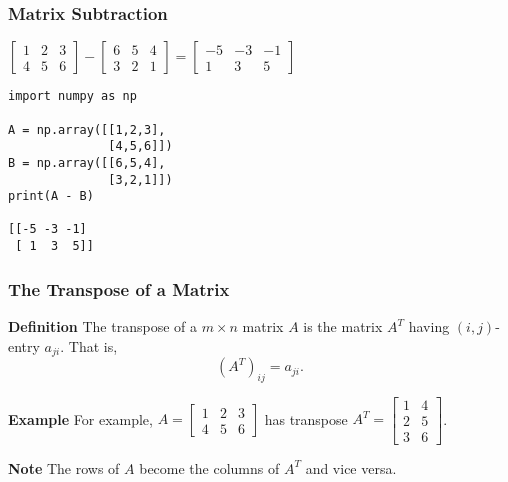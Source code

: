   \begin{frame}[fragile]\frametitle{Matrix Subtraction}
 
 $\begin{bmatrix}1 & 2 & 3 \\4 & 5 & 6\end{bmatrix}- \begin{bmatrix}6 & 5 & 4 \\3 & 2 & 1\end{bmatrix} = \begin{bmatrix}-5 & -3 & -1 \\1 & 3 & 5\end{bmatrix}$
\begin{lstlisting}
import numpy as np

A = np.array([[1,2,3],
              [4,5,6]])
B = np.array([[6,5,4],
              [3,2,1]])
print(A - B)

[[-5 -3 -1]
 [ 1  3  5]]
\end{lstlisting}

\end{frame}


\begin{frame}[fragile]\frametitle{The Transpose of a Matrix}
\textbf{Definition}
The transpose of a $m\times n$ matrix $A$ is the matrix $A^{T}$ 
having $(i,j)$-entry $a_{ji}$.  That is,
$$(A^{T})_{i j} = a_{j i}.$$



\textbf{Example}
For example, 
$ A = \left[ \begin{array}{rrr}
      1 & 2 & 3 \\
      4 & 5 & 6
     \end{array}\right]$
has transpose  
$A^T = \left[\begin{array}{rrr}
        1 & 4 \\ 
        2 & 5 \\
        3 & 6
       \end{array}\right]$.



\textbf{Note}
The rows of $A$ become the columns of $A^T$ and vice versa.

\end{frame}


